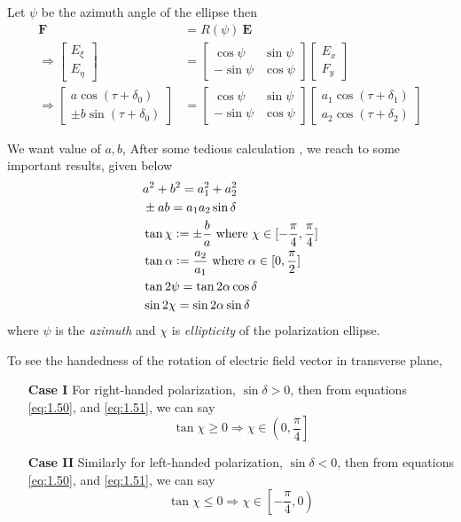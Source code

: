 \documentclass[11pt,a4paper]{article}
\numberwithin{equation}{section}
\begin{document}
Let $\psi$ be the azimuth angle of the ellipse then 
\begin{align}
	\boldsymbol{F}&= R(\psi)\:\boldsymbol{E}\\
	\Rightarrow\begin{bmatrix}E_\xi\\E_\eta\end{bmatrix}&= 
	\begin{bmatrix}
		\cos\psi & \sin\psi \\
		-\sin\psi & \cos\psi
	\end{bmatrix}
	\begin{bmatrix}E_x\\F_y\end{bmatrix}\\
	\Rightarrow
	\begin{bmatrix}
		a \cos(\tau+\delta_0)\\
		\pm b \sin(\tau+\delta_0)
	\end{bmatrix}&=
	\begin{bmatrix}
		\cos\psi & \sin\psi \\
		-\sin\psi & \cos\psi
	\end{bmatrix}
	\begin{bmatrix}
		a_1 \cos(\tau+\delta_1)\\
		a_2 \cos(\tau+\delta_2)
	\end{bmatrix}
\end{align}

We want value of $a, b$, After some tedious calculation \cite{born-wolf}, we reach to some important results, given below 
\begin{align}
	& a^2 + b^2 = a_1^2 + a_2^2\\
	&\pm ab = a_1a_2\sin\delta \label{eq:1.50}\\ 
	&\tan \chi \vcentcolon= \pm\frac{b}{a} \label{eq:1.51}\text{ where } \chi\in[-\frac{\pi}{4},\frac{\pi}{4}]\\
	&\tan \alpha \vcentcolon= \frac{a_2}{a_1} \text{ where } \alpha\in[0,\frac{\pi}{2}]\\
	&\tan 2\psi = \tan 2\alpha \cos\delta\\
	&\sin 2\chi = \sin 2\alpha \sin\delta
\end{align}
where $\psi$ is the \textit{azimuth} and $\chi$ is \textit{ellipticity} of the polarization ellipse. 

To see the handedness of the rotation of electric field vector in transverse plane,
\begin{enumerate}
	\item[\textbf{Case I}] 
	For right-handed polarization, $\sin\delta>0$, then from equations \ref{eq:1.50}, and \ref{eq:1.51}, we can say 
	$$\tan \chi \ge 0\Rightarrow \chi \in \left(0,\frac{\pi}{4}\right]$$
	
	\item[\textbf{Case II}] 
	Similarly for left-handed polarization, $\sin\delta<0$, then from equations \ref{eq:1.50}, and \ref{eq:1.51}, we can say 
	$$\tan \chi \le 0\Rightarrow \chi \in \left[-\frac{\pi}{4},0\right)$$
\end{enumerate}
	
\end{document}
